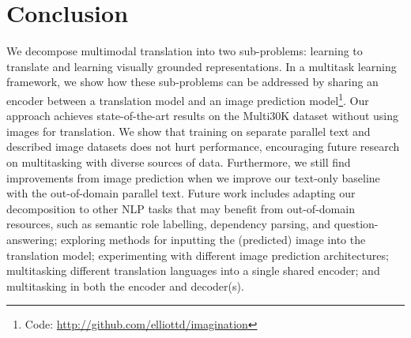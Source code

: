 \section{Conclusion}

We decompose multimodal translation into two sub-problems: learning to translate and learning visually grounded representations. In a multitask learning framework, we show how these sub-problems can be addressed by sharing an encoder between a translation model and an image prediction model\footnote{Code: \scriptsize \url{http://github.com/elliottd/imagination}}. Our approach achieves state-of-the-art results on the Multi30K dataset without using images for translation. We show that training on separate parallel text and described image datasets does not hurt performance, encouraging future research on multitasking with diverse sources of data. 
Furthermore, we still find improvements from image prediction when we improve our text-only baseline with the out-of-domain parallel text. Future work includes adapting our decomposition to other NLP tasks that may benefit from out-of-domain resources, such as semantic role labelling, dependency parsing, and question-answering; exploring methods for inputting the (predicted) image into the translation model; experimenting with different image prediction architectures; multitasking different translation languages into a single shared encoder; and multitasking in both the encoder and decoder(s).